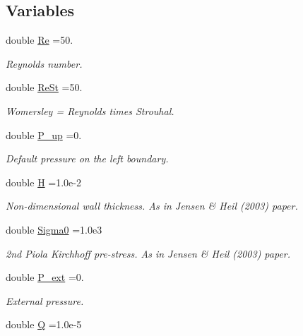 \subsection*{Variables}
\begin{DoxyCompactItemize}
\item 
double \hyperlink{namespaceGlobal__Physical__Variables_ab814e627d2eb5bc50318879d19ab16b9}{Re} =50.
\begin{DoxyCompactList}\small\item\em Reynolds number. \end{DoxyCompactList}\item 
double \hyperlink{namespaceGlobal__Physical__Variables_a085ee4bf968ffdd01a41b8c41864f907}{Re\+St} =50.
\begin{DoxyCompactList}\small\item\em Womersley = Reynolds times Strouhal. \end{DoxyCompactList}\item 
double \hyperlink{namespaceGlobal__Physical__Variables_ae1a493695b7f4619af32f405b0b28861}{P\+\_\+up} =0.
\begin{DoxyCompactList}\small\item\em Default pressure on the left boundary. \end{DoxyCompactList}\item 
double \hyperlink{namespaceGlobal__Physical__Variables_af6e07423e22c0991084d9a2f43727805}{H} =1.\+0e-\/2
\begin{DoxyCompactList}\small\item\em Non-\/dimensional wall thickness. As in Jensen \& Heil (2003) paper. \end{DoxyCompactList}\item 
double \hyperlink{namespaceGlobal__Physical__Variables_a417dc688a70c4f06ef0faed047068ba2}{Sigma0} =1.\+0e3
\begin{DoxyCompactList}\small\item\em 2nd Piola Kirchhoff pre-\/stress. As in Jensen \& Heil (2003) paper. \end{DoxyCompactList}\item 
double \hyperlink{namespaceGlobal__Physical__Variables_a0406c0cbd463d1df2458fe5de98a00eb}{P\+\_\+ext} =0.
\begin{DoxyCompactList}\small\item\em External pressure. \end{DoxyCompactList}\item 
double \hyperlink{namespaceGlobal__Physical__Variables_a66cb7ecda9ba0cd72367dd697f154545}{Q} =1.\+0e-\/5

\end{DoxyCompactItemize}

